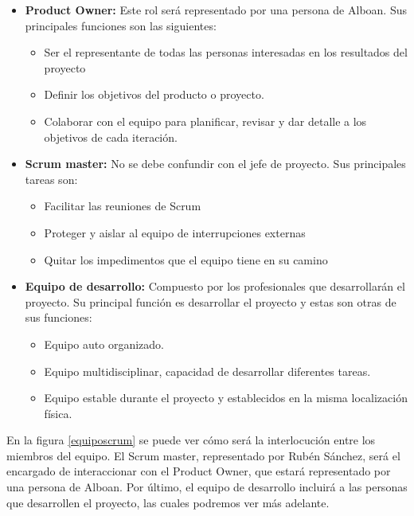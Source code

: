 \begin{itemize}
	\item \textbf{Product Owner:} Este rol será representado por una persona de Alboan. Sus principales funciones son las siguientes:
	\begin{itemize}
		\item Ser el representante de todas las personas interesadas en los resultados del proyecto
		\item Definir los objetivos del producto o proyecto.
		\item Colaborar con el equipo para planificar, revisar y dar detalle a los objetivos de cada iteración.
	\end{itemize}
	\item \textbf{Scrum master:} No se debe confundir con el jefe de proyecto. Sus principales tareas son:
	\begin{itemize}
		\item Facilitar las reuniones de Scrum
		\item Proteger y aislar al equipo de interrupciones externas
		\item Quitar los impedimentos que el equipo tiene en su camino
	\end{itemize}
	\item \textbf{Equipo de desarrollo:} Compuesto por los profesionales que desarrollarán el proyecto. Su principal función es desarrollar el proyecto y estas son otras de sus funciones:
	\begin{itemize}
		\item Equipo auto organizado.
		\item Equipo multidisciplinar, capacidad de desarrollar diferentes tareas.
		\item Equipo estable durante el proyecto y establecidos en la misma localización física.
	\end{itemize}
	
\end{itemize}

En la figura \ref{equiposcrum} se puede ver cómo será la interlocución entre los miembros del equipo. El Scrum master, representado por Rubén Sánchez, será el encargado de interaccionar con el Product Owner, que estará representado por una persona de Alboan. Por último, el equipo de desarrollo incluirá a las personas que desarrollen el proyecto, las cuales podremos ver más adelante.


